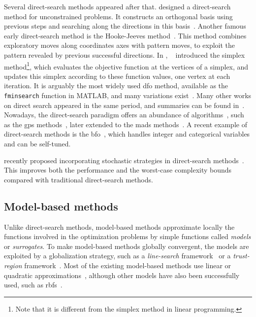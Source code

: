 Several direct-search methods appeared after that.
\citeauthor{Rosenbrock_1960} designed a direct-search method for unconstrained problems.
It constructs an orthogonal basis using previous steps and searching along the directions in this basis~\cite{Rosenbrock_1960}.
Another famous early direct-search method is the Hooke-Jeeves method~\cite{Hooke_Jeeves_1961}.
This method combines exploratory moves along coordinates axes with pattern moves, to exploit the pattern revealed by previous successful directions.
In \citeyear{Nelder_Mead_1965}, \citeauthor{Nelder_Mead_1965}~\cite{Nelder_Mead_1965} introduced the simplex method\footnote{Note that it is different from the simplex method in linear programming.}, which evaluates the objective function at the vertices of a simplex, and updates this simplex according to these function values, one vertex at each iteration.
It is arguably the most widely used \gls{dfo} method, available as the \verb|fminsearch| function in MATLAB, and many variations exist~\cite{Wright_2012}.
Many other works on direct search appeared in the same period, and summaries can be found in~\cite{Fletcher_1965,Box_1966}.
Nowadays, the direct-search paradigm offers an abundance of algorithms~\cite{Kolda_Lewis_Torczon_2003}, such as the \gls{gps} methods~\cite{Booker_Etal_1999}, later extended to the \gls{mads} methods~\cite{Audet_Dennis_2006,Abramson_Audet_2006,Abramson_Etal_2009,Audet_Dennis_Digabel_2008,Digabel_2011}.
A recent example of direct-search methods is the \gls{bfo}~\cite{Porcelli_Toint_2017,Porcelli_Toint_2022}, which handles integer and categorical variables and can be self-tuned.

 recently proposed incorporating stochastic strategies in direct-search methods~\cite{Gratton_Etal_2015,Gratton_Etal_2019}.
This improves both the performance and the worst-case complexity bounds compared with traditional direct-search methods.

\subsection{Model-based methods}
\label{subsec:model-based-methods}

Unlike direct-search methods, model-based methods approximate locally the functions involved in the optimization problems by simple functions called \emph{models} or \emph{surrogates}.
To make model-based methods globally convergent, the models are exploited by a globalization strategy, such as a \emph{line-search} framework~\cite[Ch.~3]{Nocedal_Wright_2006} or a \emph{trust-region} framework~\cite{Conn_Gould_Toint_2000,Yuan_2015}.
Most of the existing model-based methods use linear or quadratic approximations~\cite{Powell_1994,Conn_Scheinberg_Vicente_2008a,Conn_Scheinberg_Vicente_2008b}, although other models have also been successfully used, such as \glspl{rbf}~\cite{Oeuvray_2005}.


